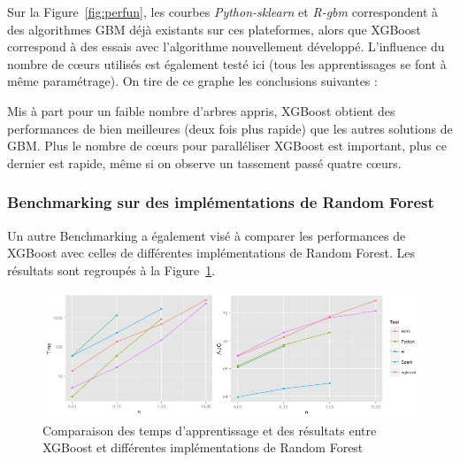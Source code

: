 Sur la Figure~\ref{fig:perfun}, les courbes \textit{Python-sklearn} et \textit{R-gbm} correspondent à des algorithmes GBM déjà existants sur ces plateformes, alors que XGBoost correspond à des essais avec l'algorithme nouvellement développé. L'influence du nombre de c\oe urs utilisés est également testé ici (tous les apprentissages se font à même paramétrage). On tire de ce graphe les conclusions suivantes :\begin{itemize}
Mis à part pour un faible nombre d'arbres appris, XGBoost obtient des performances de bien meilleures (deux fois plus rapide) que les autres solutions de GBM.
Plus le nombre de c\oe urs pour paralléliser XGBoost est important, plus ce dernier est rapide, même si on observe un tassement passé quatre c\oe urs.
\end{itemize}

\subsubsection{Benchmarking sur des implémentations de Random Forest}
Un autre Benchmarking a également visé à comparer les performances de XGBoost avec celles de différentes implémentations de Random Forest. Les résultats sont regroupés à la Figure~\ref{fig:perfdeux}.

\begin{figure}[h]
	\begin{margincap}
		\centering
		\includegraphics[width=\textwidth]{images/More/perf_deux}
		\caption{Comparaison des temps d'apprentissage et des résultats entre XGBoost et différentes implémentations de Random Forest}
		\label{fig:perfdeux}
	\end{margincap}
\end{figure}

